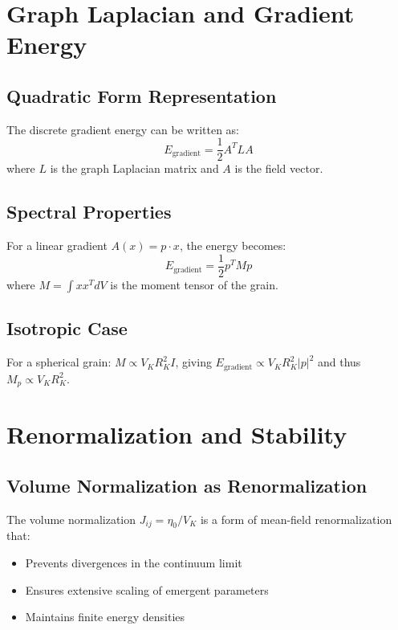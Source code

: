 \documentclass[11pt]{article}
\begin{document}
\section{Graph Laplacian and Gradient Energy}\label{si:laplacian}

\subsection{Quadratic Form Representation}

The discrete gradient energy can be written as:
\begin{equation}
E_{\text{gradient}} = \frac{1}{2} A^T L A
\end{equation}
where $L$ is the graph Laplacian matrix and $A$ is the field vector.

\subsection{Spectral Properties}

For a linear gradient $A(x) = p\cdot x$, the energy becomes:
\begin{equation}
E_{\text{gradient}} = \frac{1}{2} p^T M p
\end{equation}
where $M = \int x x^T dV$ is the moment tensor of the grain.

\subsection{Isotropic Case}

For a spherical grain: $M \propto V_K R_K^2 I$, giving $E_{\text{gradient}} \propto V_K R_K^2 |p|^2$ and thus $M_p \propto V_K R_K^2$.

\section{Renormalization and Stability}\label{si:renorm}

\subsection{Volume Normalization as Renormalization}

The volume normalization $J_{ij} = \eta_0/V_K$ is a form of mean-field renormalization that:
\begin{itemize}
\item Prevents divergences in the continuum limit
\item Ensures extensive scaling of emergent parameters
\item Maintains finite energy densities
\end{itemize}
\end{document}
